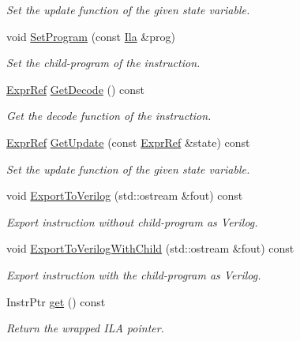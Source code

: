 \begin{DoxyCompactItemize}
\begin{DoxyCompactList}\small\item\em Set the update function of the given state variable. \end{DoxyCompactList}\item 
void \mbox{\hyperlink{classilang_1_1_instr_ref_a6ef8193b5d81b1d93f34529bf9fce9bb}{Set\+Program}} (const \mbox{\hyperlink{classilang_1_1_ila}{Ila}} \&prog)
\begin{DoxyCompactList}\small\item\em Set the child-\/program of the instruction. \end{DoxyCompactList}\item 
\mbox{\hyperlink{classilang_1_1_expr_ref}{Expr\+Ref}} \mbox{\hyperlink{classilang_1_1_instr_ref_a0c28b811ca70252542fb7629fc71f643}{Get\+Decode}} () const
\begin{DoxyCompactList}\small\item\em Get the decode function of the instruction. \end{DoxyCompactList}\item 
\mbox{\hyperlink{classilang_1_1_expr_ref}{Expr\+Ref}} \mbox{\hyperlink{classilang_1_1_instr_ref_ac149bb5581c5176642bac9585814de89}{Get\+Update}} (const \mbox{\hyperlink{classilang_1_1_expr_ref}{Expr\+Ref}} \&state) const
\begin{DoxyCompactList}\small\item\em Set the update function of the given state variable. \end{DoxyCompactList}\item 
void \mbox{\hyperlink{classilang_1_1_instr_ref_aeba473876c6b0ede7a5419ccf041f7a4}{Export\+To\+Verilog}} (std\+::ostream \&fout) const
\begin{DoxyCompactList}\small\item\em Export instruction without child-\/program as Verilog. \end{DoxyCompactList}\item 
void \mbox{\hyperlink{classilang_1_1_instr_ref_a18358b75b64144e875a5afca306d3fa7}{Export\+To\+Verilog\+With\+Child}} (std\+::ostream \&fout) const
\begin{DoxyCompactList}\small\item\em Export instruction with the child-\/program as Verilog. \end{DoxyCompactList}\item 
\mbox{\label{classilang_1_1_instr_ref_abafd68b0a612e6de87252816960ef436}} 
Instr\+Ptr \mbox{\hyperlink{classilang_1_1_instr_ref_abafd68b0a612e6de87252816960ef436}{get}} () const
\begin{DoxyCompactList}\small\item\em Return the wrapped I\+LA pointer. \end{DoxyCompactList}\end{DoxyCompactItemize}


